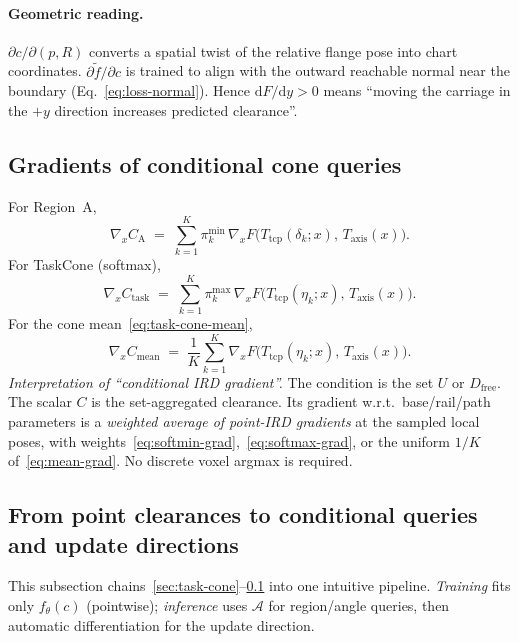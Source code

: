 \documentclass[11pt,a4paper]{article}
\newcommand{\Tcp}{T_{\mathrm{tcp}}}
\newcommand{\Taxis}{T_{\mathrm{axis}}}
\begin{document}
\paragraph{Geometric reading.}
\(\partial c/\partial(p,R)\) converts a spatial twist of the relative flange
pose into chart coordinates. \(\partial\tilde f/\partial c\) is trained to
align with the outward reachable normal near the boundary
(Eq.~\eqref{eq:loss-normal}). Hence \(\mathrm{d}F/\mathrm{d}y>0\) means
``moving the carriage in the \(+y\) direction increases predicted clearance''.

\subsection{Gradients of conditional cone queries}
\label{sec:cond-grad}

For Region~A,
\begin{equation}
\label{eq:grad-region}
  \nabla_{x} C_{\mathrm{A}}
  \;=\;
  \sum_{k=1}^{K}
  \pi_{k}^{\mathrm{min}}\,
  \nabla_{x} F\bigl(\Tcp(\delta_{k};x),\,\Taxis(x)\bigr).
\end{equation}
For TaskCone (softmax),
\begin{equation}
\label{eq:grad-task}
  \nabla_{x} C_{\mathrm{task}}
  \;=\;
  \sum_{k=1}^{K}
  \pi_{k}^{\mathrm{max}}\,
  \nabla_{x} F\bigl(\Tcp(\eta_{k};x),\,\Taxis(x)\bigr).
\end{equation}
For the cone mean~\eqref{eq:task-cone-mean},
\begin{equation}
\label{eq:grad-mean}
  \nabla_{x} C_{\mathrm{mean}}
  \;=\;
  \frac{1}{K}\sum_{k=1}^{K}
  \nabla_{x} F\bigl(\Tcp(\eta_{k};x),\,\Taxis(x)\bigr).
\end{equation}
\emph{Interpretation of ``conditional IRD gradient''.}
The condition is the set \(U\) or \(D_{\mathrm{free}}\). The scalar \(C\) is
the set-aggregated clearance. Its gradient w.r.t.\ base/rail/path parameters
is a \emph{weighted average of point-IRD gradients} at the sampled local
poses, with weights~\eqref{eq:softmin-grad},~\eqref{eq:softmax-grad},
or the uniform \(1/K\) of~\eqref{eq:mean-grad}.
No discrete voxel argmax is required.

\subsection{From point clearances to conditional queries and update directions}
\label{sec:agg-to-grad}

This subsection chains~\ref{sec:task-cone}--\ref{sec:cond-grad} into one
intuitive pipeline. \emph{Training} fits only \(f_{\theta}(c)\) (pointwise);
\emph{inference} uses \(\mathcal{A}\) for region/angle queries, then automatic
differentiation for the update direction.
\end{document}
